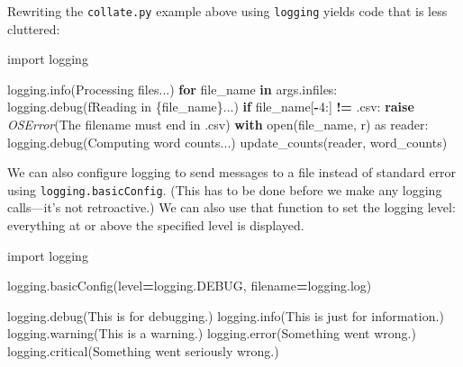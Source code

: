 \documentclass[
]{krantz}
\makeatletter
\newenvironment{Shaded}{\begin{snugshade}}{\end{snugshade}}
\newcommand{\BuiltInTok}[1]{#1}
\newcommand{\ControlFlowTok}[1]{\textcolor[rgb]{0.13,0.29,0.53}{\textbf{#1}}}
\newcommand{\DecValTok}[1]{\textcolor[rgb]{0.00,0.00,0.81}{#1}}
\newcommand{\ImportTok}[1]{#1}
\newcommand{\KeywordTok}[1]{\textcolor[rgb]{0.13,0.29,0.53}{\textbf{#1}}}
\newcommand{\NormalTok}[1]{#1}
\newcommand{\OperatorTok}[1]{\textcolor[rgb]{0.81,0.36,0.00}{\textbf{#1}}}
\newcommand{\PreprocessorTok}[1]{\textcolor[rgb]{0.56,0.35,0.01}{\textit{#1}}}
\newcommand{\SpecialCharTok}[1]{\textcolor[rgb]{0.00,0.00,0.00}{#1}}
\newcommand{\SpecialStringTok}[1]{\textcolor[rgb]{0.31,0.60,0.02}{#1}}
\newcommand{\StringTok}[1]{\textcolor[rgb]{0.31,0.60,0.02}{#1}}
\newenvironment{kframe}{%
\medskip{}
\setlength{\fboxsep}{.8em}
 \def\at@end@of@kframe{}%
 \ifinner\ifhmode%
  \def\at@end@of@kframe{\end{minipage}}%
  \begin{minipage}{\columnwidth}%
 \fi\fi%
 \def\FrameCommand##1{\hskip\@totalleftmargin \hskip-\fboxsep
 \colorbox{shadecolor}{##1}\hskip-\fboxsep
     \hskip-\linewidth \hskip-\@totalleftmargin \hskip\columnwidth}%
 \MakeFramed {\advance\hsize-\width
   \@totalleftmargin\z@ \linewidth\hsize
   \@setminipage}}%
 {\par\unskip\endMakeFramed%
 \at@end@of@kframe}
\renewenvironment{Shaded}{\begin{kframe}}{\end{kframe}}
\makeatother
\begin{document}
Rewriting the \texttt{collate.py} example above using \texttt{logging}
yields code that is less cluttered:

\begin{Shaded}
\begin{Highlighting}[]
\ImportTok{import}\NormalTok{ logging}


\NormalTok{logging.info(}\StringTok{\textquotesingle{}Processing files...\textquotesingle{}}\NormalTok{)}
\ControlFlowTok{for}\NormalTok{ file\_name }\KeywordTok{in}\NormalTok{ args.infiles:}
\NormalTok{    logging.debug(}\SpecialStringTok{f\textquotesingle{}Reading in }\SpecialCharTok{\{}\NormalTok{file\_name}\SpecialCharTok{\}}\SpecialStringTok{...\textquotesingle{}}\NormalTok{)}
    \ControlFlowTok{if}\NormalTok{ file\_name[}\OperatorTok{{-}}\DecValTok{4}\NormalTok{:] }\OperatorTok{!=} \StringTok{\textquotesingle{}.csv\textquotesingle{}}\NormalTok{:}
        \ControlFlowTok{raise} \PreprocessorTok{OSError}\NormalTok{(}\StringTok{\textquotesingle{}The filename must end in \textasciigrave{}.csv\textasciigrave{}\textquotesingle{}}\NormalTok{)}
    \ControlFlowTok{with} \BuiltInTok{open}\NormalTok{(file\_name, }\StringTok{\textquotesingle{}r\textquotesingle{}}\NormalTok{) }\ImportTok{as}\NormalTok{ reader:}
\NormalTok{        logging.debug(}\StringTok{\textquotesingle{}Computing word counts...\textquotesingle{}}\NormalTok{)}
\NormalTok{        update\_counts(reader, word\_counts)}
\end{Highlighting}
\end{Shaded}

We can also configure logging to send messages to a file instead of standard error
using \texttt{logging.basicConfig}.
(This has to be done before we make any logging calls---it's not retroactive.)
We can also use that function to set the logging level:
everything at or above the specified level is displayed.

\begin{Shaded}
\begin{Highlighting}[]
\ImportTok{import}\NormalTok{ logging}


\NormalTok{logging.basicConfig(level}\OperatorTok{=}\NormalTok{logging.DEBUG, filename}\OperatorTok{=}\StringTok{\textquotesingle{}logging.log\textquotesingle{}}\NormalTok{)}

\NormalTok{logging.debug(}\StringTok{\textquotesingle{}This is for debugging.\textquotesingle{}}\NormalTok{)}
\NormalTok{logging.info(}\StringTok{\textquotesingle{}This is just for information.\textquotesingle{}}\NormalTok{)}
\NormalTok{logging.warning(}\StringTok{\textquotesingle{}This is a warning.\textquotesingle{}}\NormalTok{)}
\NormalTok{logging.error(}\StringTok{\textquotesingle{}Something went wrong.\textquotesingle{}}\NormalTok{)}
\NormalTok{logging.critical(}\StringTok{\textquotesingle{}Something went seriously wrong.\textquotesingle{}}\NormalTok{)}
\end{Highlighting}
\end{Shaded}
\end{document}
